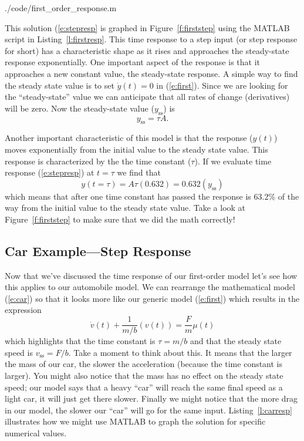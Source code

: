 
{./code/first_order_response.m}


This solution (\ref{e:stepresp} is graphed in Figure~\ref{f:firststep} using the MATLAB script in Listing~\ref{l:firstresp}. This time response to a step input (or step response for short) has a characteristic shape as it rises and approaches the \gls{steady-state response} exponentially.  One important aspect of the response is that it approaches a new constant value, the steady-state response.  A simple way to find the steady state value is to set $\dot{y}(t)=0$ in (\ref{e:first}).  Since we are looking for the ``steady-state'' value we can anticipate that all rates of change (derivatives) will be zero.  Now the steady-state value ($y_{\mathrm{ss}}$) is 
\begin{equation}\label{e:ss}
y_{\mathrm{ss}} = \tau A.
\end{equation}

Another important characteristic of this model is that the response ($y(t)$) moves exponentially from the initial value to the steady state value.  This response is characterized by the the \gls{time constant} ($\tau$).  If we evaluate time response (\ref{e:stepresp}) at $t=\tau$ we find that
\[
y(t=\tau) = A \tau (0.632) = 0.632 (y_{\mathrm{ss}})
\]
which means that after one time constant has passed the response is 63.2\% of the way from the initial value to the steady state value.  Take a look at Figure~\ref{f:firststep} to make sure that we did the math correctly!

\subsection{Car Example---Step Response}
Now that we've discussed the time response of our first-order model let's see how this applies to our automobile model.  We can rearrange the mathematical model (\ref{e:car}) so that it looks more like our generic model (\ref{e:first}) which results in the expression
\begin{equation}\label{e:car2}
\dot{v}(t) + \frac{1}{m/b}(v(t)) = \frac{F}{m}\mu(t)
\end{equation}
which highlights that the time constant is $\tau=m/b$ and that the steady state speed is $v_{\mathrm{ss}}=F/b$.  Take a moment to think about this.  It means that the larger the mass of our car, the slower the acceleration (because the time constant is larger).  You might also notice that the mass has no effect on the steady state speed; our model says that a heavy ``car'' will reach the same final speed as a light car, it will just get there slower.  Finally we might notice that the more drag in our model, the slower our ``car'' will go for the same input. Listing~\ref{l:carresp} illustrates how we might use MATLAB to graph the solution for specific numerical values.

